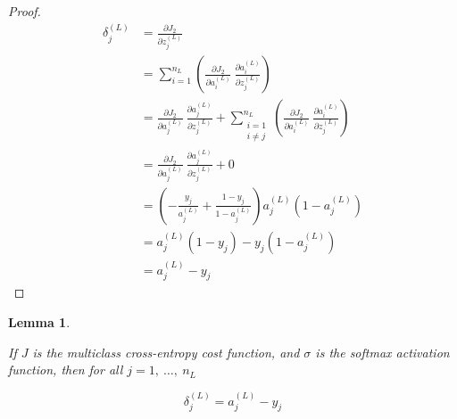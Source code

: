 \documentclass{article}[11pt]
\newtheorem{lemma}{Lemma}
\begin{document}
\begin{proof}
            $$ \begin{aligned}
            \delta^{(L)}_j &= \frac{\partial J_2}{\partial z^{(L)}_j} \\
            &= \sum_{i=1}^{n_L} \left( \frac{\partial J_2}{\partial a^{(L)}_i} \ \frac{\partial a^{(L)}_i}{\partial z^{(L)}_j} \right) \\
            &= \frac{\partial J_2}{\partial a^{(L)}_j} \ \frac{\partial a^{(L)}_j}{\partial z^{(L)}_j} + \sum_{\substack{i=1 \\ i \neq j}}^{n_L} \left( \frac{\partial J_2}{\partial a^{(L)}_i} \ \frac{\partial a^{(L)}_i}{\partial z^{(L)}_j} \right) \\
            &= \frac{\partial J_2}{\partial a^{(L)}_j} \ \frac{\partial a^{(L)}_j}{\partial z^{(L)}_j} + 0 \\
            &= \left( - \frac{y_j}{a^{(L)}_j} + \frac{1 - y_j}{1 - a^{(L)}_j} \right) a^{(L)}_j \left( 1 - a^{(L)}_j \right) \\
            &= a^{(L)}_j (1 - y_j) - y_j (1 - a^{(L)}_j) \\
            &= a^{(L)}_j - y_j
            \end{aligned} $$
            
        \end{proof}

        
        \begin{lemma} \label{thm:init_softmax}
            
            If $J$ is the multiclass cross-entropy cost function, and $\sigma$ is the softmax activation function, then for all $j = 1, \ \ldots, \ n_L$
            
            $$
            \delta^{(L)}_j = a^{(L)}_j - y_j
            $$
            
        \end{lemma}
        
\end{document}
